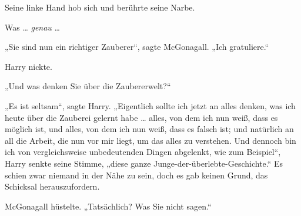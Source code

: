 Seine linke Hand hob sich und berührte seine Narbe.

Was … \emph{genau} …

„Sie sind nun ein richtiger Zauberer“, sagte McGonagall.
„Ich gratuliere.“

Harry nickte.

„Und was denken Sie über die Zaubererwelt?“

„Es ist seltsam“, sagte Harry.
„Eigentlich sollte ich jetzt an alles denken, was ich heute über die Zauberei gelernt habe … alles, von dem ich nun weiß, dass es möglich ist, und alles, von dem ich nun weiß, dass es falsch ist; und natürlich an all die Arbeit, die nun vor mir liegt, um das alles zu verstehen. Und dennoch bin ich von vergleichsweise unbedeutenden Dingen abgelenkt, wie zum Beispiel“, Harry senkte seine Stimme, „diese ganze Junge-der-überlebte-Geschichte.“ Es schien zwar niemand in der Nähe zu sein, doch es gab keinen Grund, das Schicksal herauszufordern.

McGonagall hüstelte.
„Tatsächlich? Was Sie nicht sagen.“

